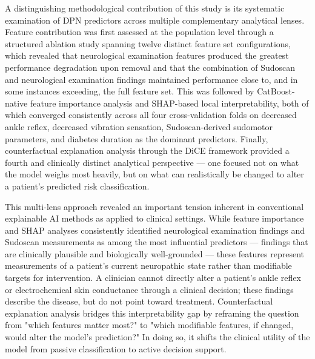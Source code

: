 \documentclass[pdflatex,sn-vancouver-num]{sn-jnl}
\begin{document}
A distinguishing methodological contribution of this study is its systematic examination of DPN predictors across multiple complementary analytical lenses. Feature contribution was first assessed at the population level through a structured ablation study spanning twelve distinct feature set configurations, which revealed that neurological examination features produced the greatest performance degradation upon removal and that the combination of Sudoscan and neurological examination findings maintained performance close to, and in some instances exceeding, the full feature set. This was followed by CatBoost-native feature importance analysis and SHAP-based local interpretability, both of which converged consistently across all four cross-validation folds on decreased ankle reflex, decreased vibration sensation, Sudoscan-derived sudomotor parameters, and diabetes duration as the dominant predictors. Finally, counterfactual explanation analysis through the DiCE framework provided a fourth and clinically distinct analytical perspective — one focused not on what the model weighs most heavily, but on what can realistically be changed to alter a patient's predicted risk classification.

This multi-lens approach revealed an important tension inherent in conventional explainable AI methods as applied to clinical settings. While feature importance and SHAP analyses consistently identified neurological examination findings and Sudoscan measurements as among the most influential predictors — findings that are clinically plausible and biologically well-grounded — these features represent measurements of a patient's current neuropathic state rather than modifiable targets for intervention. A clinician cannot directly alter a patient's ankle reflex or electrochemical skin conductance through a clinical decision; these findings describe the disease, but do not point toward treatment. Counterfactual explanation analysis bridges this interpretability gap by reframing the question from "which features matter most?" to "which modifiable features, if changed, would alter the model's prediction?" In doing so, it shifts the clinical utility of the model from passive classification to active decision support.
\end{document}
